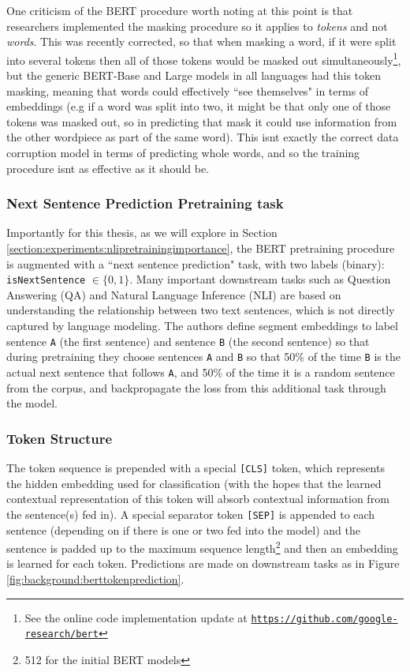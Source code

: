 {{One criticism of the BERT procedure worth noting at this point is that researchers implemented the masking procedure so it applies to \textit{tokens} and not \textit{words}. This was recently corrected, so that when masking a word, if it were split into several tokens then all of those tokens would be masked out simultaneously\footnote{See the online code implementation update at \href{https://github.com/google-research/bert}{\texttt{https://github.com/google-research/bert}}}, but the generic BERT-Base and Large models in all languages had this token masking, meaning that words could effectively ``see themselves" in terms of embeddings (e.g if a word was split into two, it might be that only one of those tokens was masked out, so in predicting that mask it could use information from the other wordpiece as part of the same word). This isnt exactly the correct data corruption model in terms of predicting whole words, and so the training procedure isnt as effective as it should be.

\subsubsection{Next Sentence Prediction Pretraining task}
Importantly for this thesis, as we will explore in Section \ref{section:experiments:nlipretrainingimportance}, the BERT pretraining procedure is augmented with a ``next sentence prediction" task, with two labels (binary): \texttt{isNextSentence} $\in \{0,1\}$. Many important downstream tasks such as Question Answering (QA) and Natural Language Inference (NLI) are based on understanding the relationship between two text sentences, which is not directly captured by language modeling. The authors define segment embeddings to label sentence \texttt{A} (the first sentence) and sentence \texttt{B} (the second sentence) so that during pretraining they choose sentences \texttt{A} and \texttt{B} so that 50\% of the time \texttt{B} is the actual next sentence that follows \texttt{A}, and 50\% of the time it is a random sentence from the corpus, and backpropagate the loss from this additional task through the model.

\subsubsection{Token Structure}
The token sequence is prepended with a special \texttt{[CLS]} token, which represents the hidden embedding used for classification (with the hopes that the learned contextual representation of this token will absorb contextual information from the sentence(s) fed in). A special separator token \texttt{[SEP]} is appended to each sentence (depending on if there is one or two fed into the model) and the sentence is padded up to the maximum sequence length\footnote{512 for the initial BERT models} and then an embedding is learned for each token. Predictions are made on downstream tasks as in Figure \ref{fig:background:berttokenprediction}.

}}
